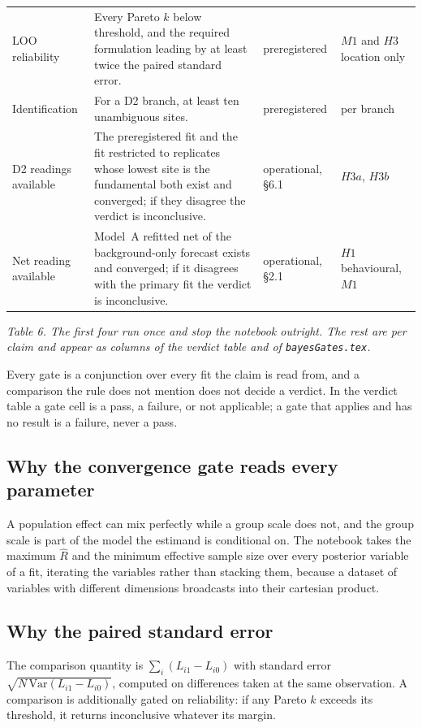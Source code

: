 \documentclass[10pt,a4paper]{article}
\newcommand{\code}[1]{\texttt{\UseBreakableUnderscores #1}}
\newcommand{\UseBreakableUnderscores}{\def\_{\textunderscore\allowbreak}}
\begin{document}
\begin{center}
\begin{longtable}{@{}L{2.9cm}L{6.9cm}L{2.9cm}L{2.7cm}@{}}
LOO reliability & Every Pareto $k$ below threshold, and the required formulation leading by at least twice the paired standard error. & preregistered & $M1$ and $H3$ location only\\
Identification & For a D2 branch, at least ten unambiguous sites. & preregistered & per branch\\
D2 readings available & The preregistered fit and the fit restricted to replicates whose lowest site is the fundamental both exist and converged; if they disagree the verdict is inconclusive. & operational, §6.1 & $H3a$, $H3b$\\
Net reading available & Model~A refitted net of the background-only forecast exists and converged; if it disagrees with the primary fit the verdict is inconclusive. & operational, §2.1 & $H1$ behavioural, $M1$\\
\bottomrule
\end{longtable}
\end{center}
{\small\itshape Table 6. The first four run once and stop the notebook outright. The rest are per claim and appear as columns of the verdict table and of \code{bayesGates.tex}.}

Every gate is a conjunction over every fit the claim is read from, and a comparison the rule does not mention does not decide a verdict. In the verdict table a gate cell is a pass, a failure, or not applicable; a gate that applies and has no result is a failure, never a pass.

\subsection{Why the convergence gate reads every parameter}
A population effect can mix perfectly while a group scale does not, and the group scale is part of the model the estimand is conditional on. The notebook takes the maximum $\hat R$ and the minimum effective sample size over every posterior variable of a fit, iterating the variables rather than stacking them, because a dataset of variables with different dimensions broadcasts into their cartesian product.

\subsection{Why the paired standard error}
The comparison quantity is $\sum_i(L_{i1}-L_{i0})$ with standard error $\sqrt{N\,\mathrm{Var}(L_{i1}-L_{i0})}$, computed on differences taken at the same observation. A comparison is additionally gated on reliability: if any Pareto $k$ exceeds its threshold, it returns inconclusive whatever its margin.
\end{document}
